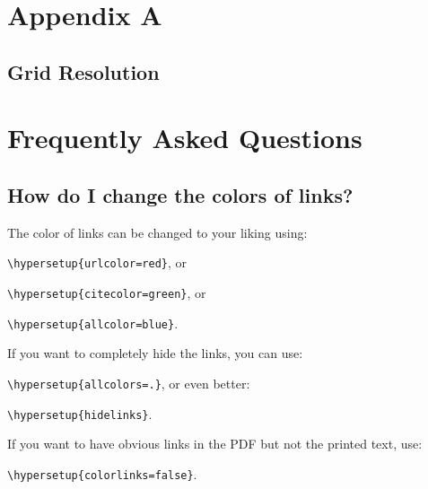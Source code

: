 

\chapter{Appendix A} %
\label{app_a}

%

\section{Grid Resolution}


\chapter{Frequently Asked Questions} %

\label{AppendixA} %

\section{How do I change the colors of links?}

The color of links can be changed to your liking using:

{\small\verb!\hypersetup{urlcolor=red}!}, or

{\small\verb!\hypersetup{citecolor=green}!}, or

{\small\verb!\hypersetup{allcolor=blue}!}.

\noindent If you want to completely hide the links, you can use:

{\small\verb!\hypersetup{allcolors=.}!}, or even better: 

{\small\verb!\hypersetup{hidelinks}!}.

\noindent If you want to have obvious links in the PDF but not the printed text, use:

{\small\verb!\hypersetup{colorlinks=false}!}.
